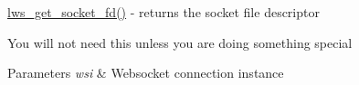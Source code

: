 \hyperlink{group__callback-when-writeable_gaa709e02a10558753c851e58f1e2c16ba}{lws\+\_\+get\+\_\+socket\+\_\+fd()} -\/ returns the socket file descriptor

You will not need this unless you are doing something special


\begin{DoxyParams}{Parameters}
{\em wsi} & Websocket connection instance \\
\hline
\end{DoxyParams}
